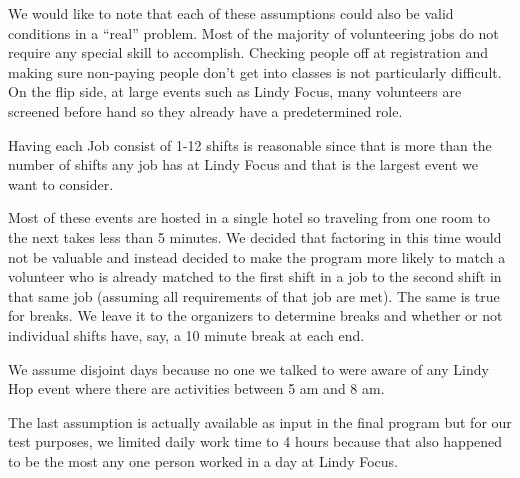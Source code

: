 \documentclass[11pt]{article}
\theoremstyle{definition}
\begin{document}
\begin{multicols}{2}
We would like to note that each of these assumptions could also be valid conditions in a ``real'' problem.
Most of the majority of volunteering jobs do not require any special skill to accomplish.
Checking people off at registration and making sure non-paying people don't get into classes is not particularly difficult.
On the flip side, at large events such as Lindy Focus, many volunteers are screened before hand so they already have a predetermined role.

Having each Job consist of 1-12 shifts is reasonable since that is more than the number of shifts any job has at Lindy Focus and that is the largest event we want to consider.

Most of these events are hosted in a single hotel so traveling from one room to the next takes less than 5 minutes.
We decided that factoring in this time would not be valuable and instead decided to make the program more likely to match a volunteer who is already matched to the first shift in a job to the second shift in that same job (assuming all requirements of that job are met).
The same is true for breaks.
We leave it to the organizers to determine breaks and whether or not individual shifts have, say, a 10 minute break at each end.

We assume disjoint days because no one we talked to were aware of any Lindy Hop event where there are activities between 5 am and 8 am.

The last assumption is actually available as input in the final program but for our test purposes, we limited daily work time to 4 hours because that also happened to be the most any one person worked in a day at Lindy Focus.


\end{multicols}
\end{document}
